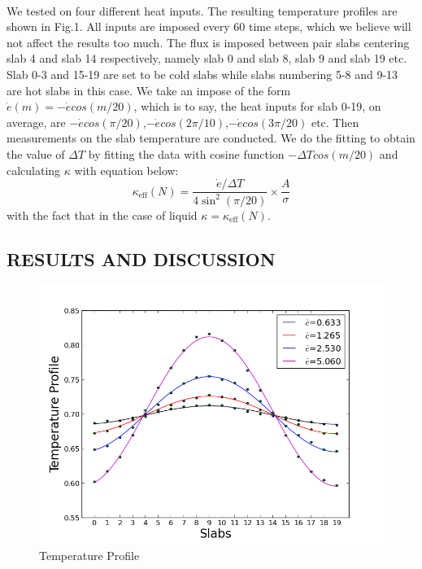 \documentclass[twocolumn]{article}
\begin{document}
\paragraph*{}
We tested on four different heat inputs. The resulting temperature profiles are shown in Fig.1. All inputs are imposed every 60 time steps, which we believe will not affect the results too much. The flux is imposed between pair slabs centering slab 4 and slab 14 respectively, namely slab 0 and slab 8, slab 9 and slab 19 etc. Slab 0-3 and 15-19 are set to be cold slabs while slabs numbering 5-8 and 9-13 are hot slabs in this case. We take an impose of the form $\dot{e}(m)=-\dot{e}cos(m/20)$, which is to say, the heat inputs for slab 0-19, on average, are $-\dot{e}cos(\pi/20)$,$-\dot{e}cos(2\pi/10)$,$-\dot{e}cos(3\pi/20)$ etc. Then measurements on the slab temperature are conducted. We do the fitting to obtain the value of $\Delta T$ by fitting the data with cosine function $-\Delta Tcos(m/20)$ and calculating $\kappa$ with equation below:
\begin{equation}
\kappa_{\mbox{eff}}(N)=\frac{\dot{e}/\Delta T}{4\sin^2(\pi/20)}\times\frac{A}{\sigma}
\end{equation}
with the fact that in the case of liquid $\kappa=\kappa_{\mbox{eff}}(N)$.
\subsection*{RESULTS AND DISCUSSION}

\begin{figure}[h] %
\centering
\includegraphics[width=\linewidth]{Experiments.png}
\caption{Temperature Profile}
\end{figure}
\end{document}
